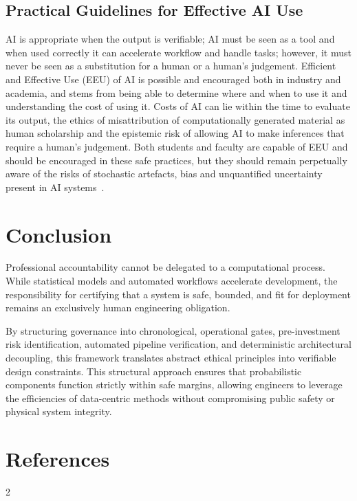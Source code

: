 ﻿\documentclass[11pt,a4paper]{article}
\begin{document}
\subsection{Practical Guidelines for Effective AI Use}
AI is appropriate when the output is verifiable; AI must be seen as a tool and when used correctly it can accelerate workflow and handle tasks; however, it must never be seen as a substitution for a human or a human's judgement. Efficient and Effective Use (EEU) of AI is possible and encouraged both in industry and academia, and stems from being able to determine where and when to use it and understanding the cost of using it. Costs of AI can lie within the time to evaluate its output, the ethics of misattribution of computationally generated material as human scholarship and the epistemic risk of allowing AI to make inferences that require a human's judgement. Both students and faculty are capable of EEU and should be encouraged in these safe practices, but they should remain perpetually aware of the risks of stochastic artefacts, bias and unquantified uncertainty present in AI systems~\cite{mehrabi2021, gal2016}.

\section{Conclusion}
\label{sec:conclusion}
Professional accountability cannot be delegated to a computational process. While statistical models and automated workflows accelerate development, the responsibility for certifying that a system is safe, bounded, and fit for deployment remains an exclusively human engineering obligation. 

By structuring governance into chronological, operational gates, pre-investment risk identification, automated pipeline verification, and deterministic architectural decoupling, this framework translates abstract ethical principles into verifiable design constraints. This structural approach ensures that probabilistic components function strictly within safe margins, allowing engineers to leverage the efficiencies of data-centric methods without compromising public safety or physical system integrity.

\section*{References}
\begin{multicols}{2}
  \renewcommand*{\bibfont}{\small}
  \printbibliography[heading=none]
\end{multicols}
\end{document}
